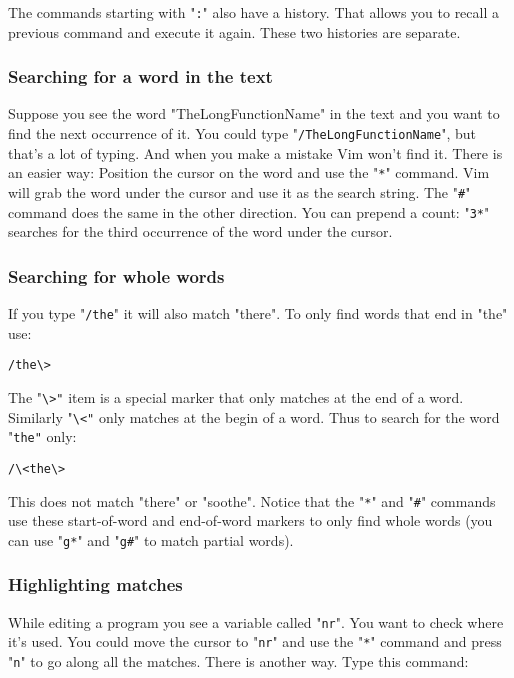 The commands starting with "\verb!:!" also have a history.
That allows you to recall a previous command and execute it again.
These two histories are separate.

\subsubsection{Searching for a word in the text}

Suppose you see the word "TheLongFunctionName" in the text and you want to find the next occurrence of it.
You could type "\verb!/TheLongFunctionName!", but that's a lot of typing.
And when you make a mistake Vim won't find it.
There is an easier way: Position the cursor on the word and use the "\verb!*!" command.
Vim will grab the word under the cursor and use it as the search string.
The "\verb!#!" command does the same in the other direction.
You can prepend a count: "\verb!3*!" searches for the third occurrence of the word under the cursor.

\subsubsection{Searching for whole words}

If you type "\verb!/the!" it will also match "there".
To only find words that end in "the" use:

 \begin{Verbatim}[samepage=true]
 /the\>
 \end{Verbatim}

The "\verb!\>"! item is a special marker that only matches at the end of a word.
Similarly "\verb!\<"! only matches at the begin of a word.
Thus to search for the word "\verb!the"! only:

 \begin{Verbatim}[samepage=true]
 /\<the\>
 \end{Verbatim}

This does not match "there" or "soothe".
Notice that the "\verb!*!" and "\verb!#!" commands use these start-of-word and end-of-word markers to only find whole words (you can use "\verb!g*!" and "\verb!g#!" to match partial words).

\subsubsection{Highlighting matches}

While editing a program you see a variable called "\verb!nr!".
You want to check where it's used.
You could move the cursor to "\verb!nr!" and use the "\verb!*!" command and press "\verb!n!" to go along all the matches.
There is another way.
Type this command:

